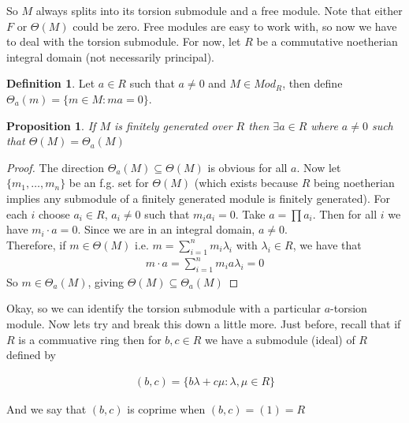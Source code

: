 \documentclass[12pt]{book}
\newtheorem{proposition}[theorem]{Proposition}
\theoremstyle{definition}
\newtheorem{definition}[theorem]{Definition}
\begin{document}
So $M$ always splits into its torsion submodule and a free module. Note that either $F$ or $\Theta(M)$ could be zero. Free modules are easy to work with, so now we have to deal with the torsion submodule. For now, let $R$ be a commutative noetherian integral domain (not necessarily principal).

\begin{definition}
    Let $a \in R$ such that $a \neq 0$ and $M \in Mod_R$, then define $\Theta_a(m) = \{m \in M: ma = 0\}$. 
\end{definition}

\begin{proposition}
    \label{Identification of Torsion Module}
    If $M$ is finitely generated over $R$ then $\exists a \in R$ where $a \neq 0$ such that $\Theta(M) = \Theta_a(M)$
\end{proposition}
\begin{proof}
    The direction $\Theta_a(M) \subseteq \Theta(M)$ is obvious for all $a$. Now let $\{m_1, \dots, m_n\}$ be an f.g. set for $\Theta(M)$ (which exists because $R$ being noetherian implies any submodule of a finitely generated module is finitely generated). For each $i$ choose $a_i \in R$, $a_i \neq 0$ such that $m_ia_i = 0$. Take $a = \prod a_i$. Then for all $i$ we have $m_i \cdot a = 0$. Since we are in an integral domain, $a \neq 0$.\\
    Therefore, if $m \in \Theta(M)$ i.e. $m = \sum_{i = 1}^{n}m_i \lambda_i$ with $\lambda_i \in R$, we have that
    \begin{align*}
        m\cdot a = \sum_{i = 1}^{n} m_i a \lambda_i = 0 
    \end{align*}
    So $m \in \Theta_a(M)$, giving $\Theta(M) \subseteq \Theta_a(M)$
\end{proof}

Okay, so we can identify the torsion submodule with a particular $a$-torsion module. Now lets try and break this down a little more. Just before, recall that if $R$ is a commuative ring then for $b,c \in R$ we have a submodule (ideal) of $R$ defined by 

\begin{align*}
    (b,c) = \{ b\lambda + c \mu : \lambda, \mu \in R\}
\end{align*}

And we say that $(b,c)$ is coprime when $(b,c) = (1) = R$
\end{document}
